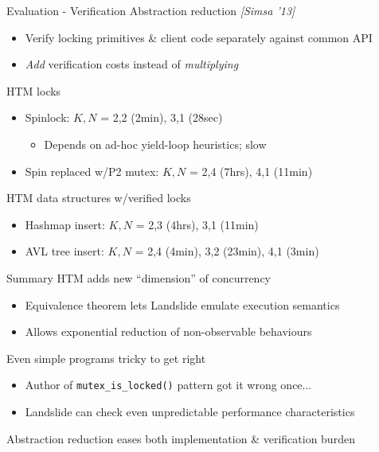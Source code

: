\documentclass[xcolor=dvipsnames]{beamer}
\begin{document}
\begin{frame}{Evaluation - Verification}
	Abstraction reduction {\em [Simsa '13]}
	\begin{itemize}
		\item Verify locking primitives \& client code separately against common API
		\item {\em Add} verification costs instead of {\em multiplying}
	\end{itemize}
	\linegap

	HTM locks
	\begin{itemize}
		\item Spinlock: $K,N$ = 2,2 (2min), 3,1 (28sec)
			\begin{itemize}
				\item Depends on ad-hoc yield-loop heuristics; slow
			\end{itemize}
		\item Spin replaced w/P2 mutex: $K,N$ = 2,4 (7hrs), 4,1 (11min)
	\end{itemize}
	\pause
	\linegap

	HTM data structures w/verified locks
	\begin{itemize}
		\item Hashmap insert: $K,N$ = 2,3 (4hrs), 3,1 (11min)
		\item AVL tree insert: $K,N$ = 2,4 (4min), 3,2 (23min), 4,1 (3min)
	\end{itemize}
\end{frame}

\begin{frame}{Summary}
	HTM adds new ``dimension'' of concurrency
	\begin{itemize}
		\item Equivalence theorem lets Landslide emulate execution semantics
		\item Allows exponential reduction of non-observable behaviours
	\end{itemize}
	\linegap

	Even simple programs tricky to get right
	\begin{itemize}
		\item Author of {\tt mutex\_is\_locked()} pattern got it wrong once...
		\item Landslide can check even unpredictable performance characteristics
	\end{itemize}
	\linegap

	Abstraction reduction eases both implementation \& verification burden
\end{frame}
\end{document}
